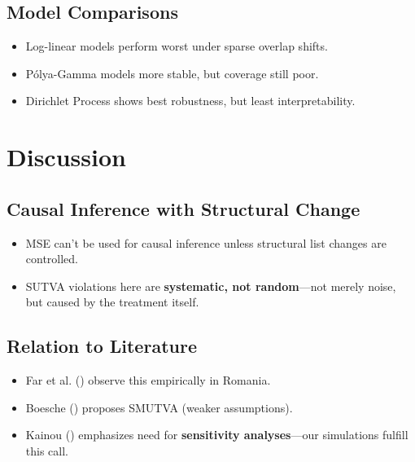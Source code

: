 \documentclass[
  12pt,
]{article}
\providecommand{\tightlist}{%
  \setlength{\itemsep}{0pt}\setlength{\parskip}{0pt}}\usepackage{longtable,booktabs,array}
\theoremstyle{plain}
\theoremstyle{definition}
\begin{document}
\subsection{Model Comparisons}\label{model-comparisons}

\begin{itemize}
\tightlist
\item
  Log-linear models perform worst under sparse overlap shifts.\\
\item
  Pólya-Gamma models more stable, but coverage still poor.\\
\item
  Dirichlet Process shows best robustness, but least interpretability.
\end{itemize}

\section{Discussion}\label{discussion}

\subsection{Causal Inference with Structural
Change}\label{causal-inference-with-structural-change}

\begin{itemize}
\tightlist
\item
  MSE can't be used for causal inference unless structural list changes
  are controlled.\\
\item
  SUTVA violations here are \textbf{systematic, not random}---not merely
  noise, but caused by the treatment itself.
\end{itemize}

\subsection{Relation to Literature}\label{relation-to-literature}

\begin{itemize}
\tightlist
\item
  Far et al. () observe this
  empirically in Romania.
\item
  Boesche () proposes SMUTVA
  (weaker assumptions).
\item
  Kainou () emphasizes need for
  \textbf{sensitivity analyses}---our simulations fulfill this call.
\end{itemize}
\end{document}
